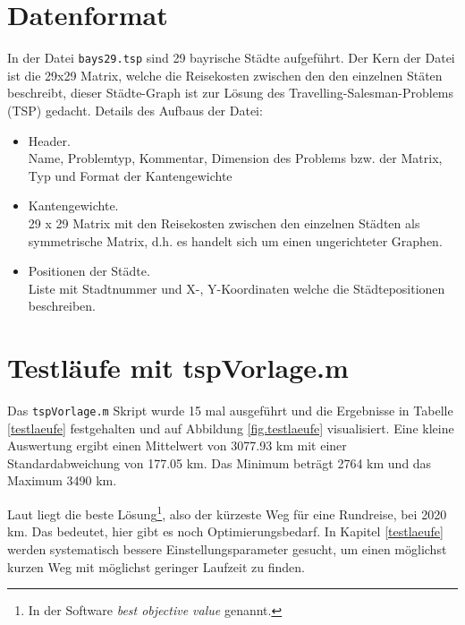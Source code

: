 \section{Datenformat}

\noindent In der Datei {\tt bays29.tsp} sind 29 bayrische Städte aufgeführt.
Der Kern der Datei ist die 29x29 Matrix, welche die Reisekosten zwischen
den den einzelnen Stäten beschreibt, dieser Städte-Graph ist zur Lösung
des Travelling-Salesman-Problems (TSP) gedacht.
Details des Aufbaus der Datei:

\begin{itemize}
  \item Header.\\
  Name, Problemtyp, Kommentar, Dimension des Problems bzw. der Matrix, Typ und Format der Kantengewichte
  \item Kantengewichte.\\
  29 x 29 Matrix mit den Reisekosten zwischen den einzelnen Städten als symmetrische Matrix, d.h. es handelt sich um einen ungerichteter Graphen.
  \item Positionen der Städte.\\
  Liste mit Stadtnummer und X-, Y-Koordinaten welche die Städtepositionen beschreiben.
\end{itemize}


\section{Testläufe mit tspVorlage.m}

Das {\tt tspVorlage.m} Skript wurde 15 mal ausgeführt und die Ergebnisse in
Tabelle \ref{testlaeufe} festgehalten und auf Abbildung \ref{fig.testlaeufe}
visualisiert.
Eine kleine Auswertung ergibt einen Mittelwert von 3077.93 km mit
einer Standardabweichung von 177.05 km.
Das Minimum beträgt 2764 km und das Maximum 3490 km.

Laut \cite{aufg} liegt die beste
Lösung\footnote{In der Software \emph{best objective value} genannt.},
also der kürzeste Weg für eine Rundreise, bei 2020 km.
Das bedeutet, hier gibt es noch Optimierungsbedarf.
In Kapitel \ref{testlaeufe} werden systematisch bessere Einstellungsparameter
gesucht, um einen möglichst kurzen Weg mit möglichst geringer Laufzeit zu finden.

